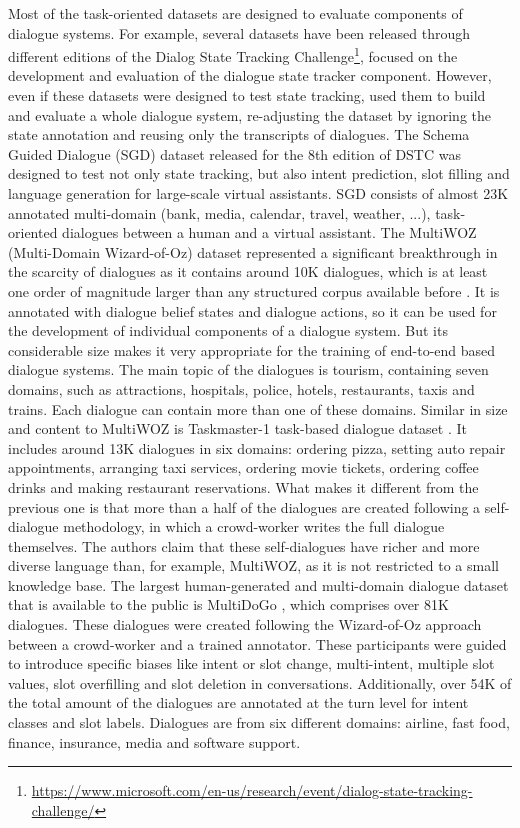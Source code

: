Most of the task-oriented datasets are designed to evaluate components of dialogue systems. For example, several datasets have been released through different editions of the Dialog State Tracking Challenge\footnote{\url{https://www.microsoft.com/en-us/research/event/dialog-state-tracking-challenge/}}, focused on the development and evaluation of the dialogue state tracker component. However, even if these datasets were designed to test state tracking,  used them to build and evaluate a whole dialogue system, re-adjusting the dataset by ignoring the state annotation and reusing only the transcripts of dialogues. The Schema Guided Dialogue (SGD) dataset released for the 8th edition of DSTC was designed to test not only state tracking, but also intent prediction, slot filling and language generation for large-scale virtual assistants. SGD consists of almost 23K annotated multi-domain (bank, media, calendar, travel, weather, ...), task-oriented dialogues between a human and a virtual assistant.
The MultiWOZ (Multi-Domain Wizard-of-Oz) dataset represented a significant breakthrough in the scarcity of dialogues as it contains around 10K dialogues, which is at least one order of magnitude larger than any structured corpus available before  . It is annotated with dialogue belief states and dialogue actions, so it can be used for the development of individual components of a dialogue system. But its considerable size makes it very appropriate for the training of end-to-end based dialogue systems. The main topic of the dialogues is tourism, containing seven domains, such as attractions, hospitals, police, hotels, restaurants, taxis and trains. Each dialogue can contain more than one of these domains.
Similar in size and content to MultiWOZ is Taskmaster-1 task-based dialogue dataset . It includes around 13K dialogues in six domains: ordering pizza, setting auto repair appointments, arranging taxi services, ordering movie tickets, ordering coffee drinks and making restaurant reservations. What makes it different from the previous one is that more than a half of the dialogues are created following a self-dialogue methodology, in which a crowd-worker writes the full dialogue themselves. The authors claim that these self-dialogues have richer and more diverse language than, for example, MultiWOZ, as it is not restricted to a small knowledge base.
The largest human-generated and multi-domain dialogue dataset that is available to the public is MultiDoGo , which comprises over 81K dialogues. These dialogues were created following the Wizard-of-Oz approach between a crowd-worker and a trained annotator. These participants were guided to introduce specific biases like intent or slot change, multi-intent, multiple slot values, slot overfilling and slot deletion in conversations. Additionally, over 54K of the total amount of the dialogues are annotated at the turn level for intent classes and slot labels. Dialogues are from six different domains: airline, fast food, finance, insurance, media and software support.
